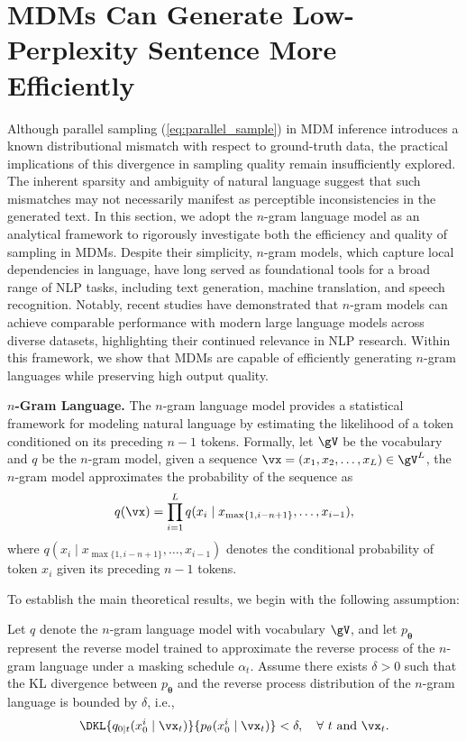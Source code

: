 
\section{MDMs Can Generate Low-Perplexity Sentence More Efficiently}
\label{sec:positive}

Although parallel sampling (\cref{eq:parallel_sample}) in MDM inference introduces a known distributional mismatch with respect to ground-truth data, the practical implications of this divergence in sampling quality remain insufficiently explored. The inherent sparsity and ambiguity of natural language suggest that such mismatches may not necessarily manifest as perceptible inconsistencies in the generated text. In this section, we adopt the $n$-gram language model as an analytical framework to rigorously investigate both the efficiency and quality of sampling in MDMs. Despite their simplicity, $n$-gram models, which capture local dependencies in language, have long served as foundational tools for a broad range of NLP tasks, including text generation, machine translation, and speech recognition. Notably, recent studies have demonstrated that $n$-gram models can achieve comparable performance with modern large language models across diverse datasets, highlighting their continued relevance in NLP research. Within this framework, we show that MDMs are capable of efficiently generating $n$-gram languages while preserving high output quality.

\textbf{$n$-Gram Language.} The $n$-gram language model provides a statistical framework for modeling natural language by estimating the likelihood of a token conditioned on its preceding \(n-1\) tokens. Formally, let $\gV$ be the vocabulary and $q$ be the $n$-gram model, given a sequence $\vx = (x_1, x_2, \dots, x_L)\in\gV^L$, the $n$-gram model approximates the probability of the sequence as
\begin{equation}
    q(\vx) = \prod_{i=1}^L q(x_i \mid x_{\max\{1,i-n+1\}}, \dots, x_{i-1}),
\end{equation}
where $q(x_i \mid x_{\max\{1,i-n+1\}}, \dots, x_{i-1})$ denotes the conditional probability of token $x_i$ given its preceding \(n-1\) tokens. 
%

To establish the main theoretical results, we begin with the following assumption:

\begin{assumption}
\label{ass:perfect_learning}
    Let $q$ denote the $n$-gram language model with vocabulary $\gV$, and let $p_\mathbf{\theta}$ represent the reverse model trained to approximate the reverse process of the $n$-gram language under a masking schedule $\alpha_t$. Assume there exists $\delta > 0$ such that the KL divergence between $p_\mathbf{\theta}$ and the reverse process distribution of the $n$-gram language is bounded by $\delta$, i.e.,
    \begin{equation*}
        \DKL{q_{0|t}(x_0^i \mid \vx_t)}{p_\mathbf{\theta}(x_0^i \mid \vx_t)} < \delta, \quad \forall\ t \text{ and } \vx_t.
    \end{equation*}
\end{assumption}

